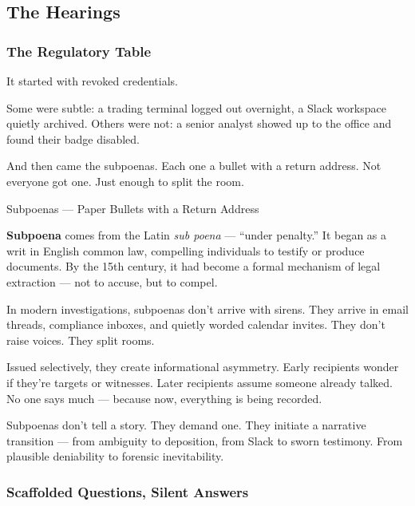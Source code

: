 \subsection{The Hearings}


\subsubsection{The Regulatory Table}

It started with revoked credentials.

Some were subtle: a trading terminal logged out overnight, a Slack workspace quietly archived.
Others were not: a senior analyst showed up to the office and found their badge disabled.

And then came the subpoenas.
Each one a bullet with a return address.
Not everyone got one.
Just enough to split the room.

\medskip

\begin{HistoricalSidebar}{Subpoenas --- Paper Bullets with a Return Address}

  \textbf{Subpoena} comes from the Latin \textit{sub poena} — ``under penalty.'' It began as a writ in English 
  common law, compelling individuals to testify or produce documents. By the 15th century, it had become a 
  formal mechanism of legal extraction — not to accuse, but to compel.

  \medskip

  In modern investigations, subpoenas don’t arrive with sirens. They arrive in email threads, compliance inboxes, 
  and quietly worded calendar invites. They don’t raise voices. They split rooms.

  \medskip

  Issued selectively, they create informational asymmetry. Early recipients wonder if they’re targets or witnesses. 
  Later recipients assume someone already talked. No one says much — because now, everything is being recorded.

  \medskip

  Subpoenas don’t tell a story. They demand one. They initiate a narrative transition — from ambiguity to deposition, 
  from Slack to sworn testimony. From plausible deniability to forensic inevitability.
  
\end{HistoricalSidebar}

\medskip

\subsubsection{Scaffolded Questions, Silent Answers}

